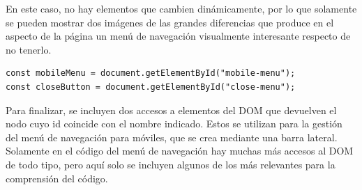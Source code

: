 \documentclass[11pt, a4paper]{book}
\begin{document}
	En este caso, no hay elementos que cambien dinámicamente, por lo que solamente se pueden mostrar dos imágenes de las grandes diferencias que produce en el aspecto de la página un menú de navegación visualmente interesante respecto de no tenerlo.
	
	
	\begin{lstlisting}
const mobileMenu = document.getElementById("mobile-menu");
const closeButton = document.getElementById("close-menu");
	\end{lstlisting}

	Para finalizar, se incluyen dos accesos a elementos del DOM que devuelven el nodo cuyo id coincide con el nombre indicado. Estos se utilizan para la gestión del menú de navegación para móviles, que se crea mediante una barra lateral. Solamente en el código del menú de navegación hay muchas más accesos al DOM de todo tipo, pero aquí solo se incluyen algunos de los más relevantes para la comprensión del código.
	
\end{document}
